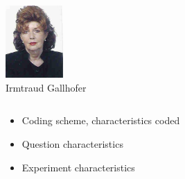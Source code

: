 \documentclass{beamer}
\begin{document}
\begin{frame}
\begin{small}
\begin{columns}[T]
\begin{column}{2.5cm}
		\includegraphics[width=2.2cm]{i/gallhofer.jpg}\\
		 Irmtraud Gallhofer		
		\end{column}		
	\end{columns}
	\end{small}
\end{frame}
\fi

\begin{frame}
\begin{itemize}
	\item Coding scheme, characteristics coded
	\item Question characteristics
	\item Experiment characteristics
\end{itemize}

\end{frame}
\end{document}
